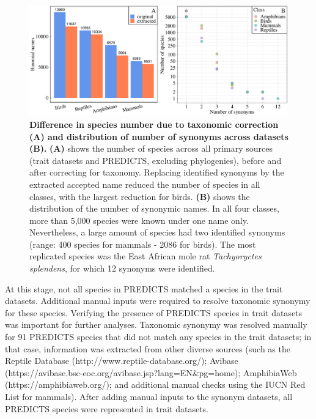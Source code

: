 \vspace{0.5cm}
\begin{figure}[h!]
\includegraphics[scale=0.45]{figures/chapter2/Taxonomic_corrections/tax_corrections}
\caption[Difference in species number due to taxonomic correction (A) and distribution of number of synonyms across datasets (B)]{\textbf{Difference in species number due to taxonomic correction (A) and distribution of number of synonyms across datasets (B).} \textbf{(A)} shows the number of species across all primary sources (trait datasets and PREDICTS, excluding phylogenies), before and after correcting for taxonomy. Replacing identified synonyms by the extracted accepted name reduced the number of species in all classes, with the largest reduction for birds. \textbf{(B)} shows the distribution of the number of synonymic names. In all four classes, more than 5,000 species were known under one name only. Nevertheless, a large amount of species had two identified synonyms (range: 400 species for mammals - 2086 for birds). The most replicated species was the East African mole rat \textit{Tachyoryctes splendens}, for which 12 synonyms were identified.}
\label{taxcor}
\end{figure}


At this stage, not all species in PREDICTS matched a species in the trait datasets. Additional manual inputs were required to resolve taxonomic synonymy for these species. Verifying the presence of PREDICTS species in trait datasets was important for further analyses. Taxonomic synonymy was resolved manually for 91 PREDICTS species that did not match any species in the trait datasets; in that case, information was extracted from other diverse sources (such as the Reptile Database (http://www.reptile-database.org/); Avibase (https://avibase.bsc-eoc.org/avibase.jsp?lang=EN\&pg=home); AmphibiaWeb (https://amphibiaweb.org/); and additional manual checks using the IUCN Red List for mammals). After adding manual inputs to the synonym datasets, all PREDICTS species were represented in trait datasets. 

